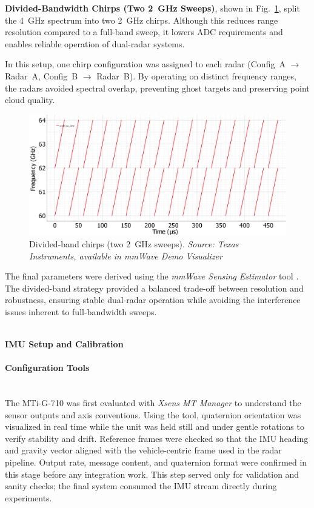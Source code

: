 \textbf{Divided-Bandwidth Chirps (Two 2~GHz Sweeps)}, shown in Fig.~\ref{fig:profile2GHz}, split the 4~GHz spectrum into two 2~GHz chirps.  
Although this reduces range resolution compared to a full-band sweep, it lowers ADC requirements and enables reliable operation of dual-radar systems.  

In this setup, one chirp configuration was assigned to each radar (Config~A $\rightarrow$ Radar~A, Config~B $\rightarrow$ Radar~B).  
By operating on distinct frequency ranges, the radars avoided spectral overlap, preventing ghost targets and preserving point cloud quality.  

\begin{figure}[!htbp]
    \centering
    \includegraphics[width=0.7\linewidth]{images/profile_two_2GHz.png}
    \caption{Divided-band chirps (two 2~GHz sweeps).  
    \textit{Source: Texas Instruments, available in mmWave Demo Visualizer \cite{mmwave_demo_doc}}}
    \label{fig:profile2GHz}
\end{figure}

The final parameters were derived using the \textit{mmWave Sensing Estimator} tool \cite{mmwave_demo_output}.  
The divided-band strategy provided a balanced trade-off between resolution and robustness, ensuring stable dual-radar operation while avoiding the interference issues inherent to full-bandwidth sweeps.

\hfill
\\
\vspace{0.5em}
\noindent\textbf{IMU Setup and Calibration}
\label{sec:imu_setup_calibration}

\setcounter{paragraph}{0} %

\paragraph{Configuration Tools}
\hfill
\\
The MTi-G-710 was first evaluated with \textit{Xsens MT Manager} to understand the sensor outputs and axis conventions.  
Using the tool, quaternion orientation was visualized in real time while the unit was held still and under gentle rotations to verify stability and drift.  
Reference frames were checked so that the IMU heading and gravity vector aligned with the vehicle-centric frame used in the radar pipeline.  
Output rate, message content, and quaternion format were confirmed in this stage before any integration work.  
This step served only for validation and sanity checks; the final system consumed the IMU stream directly during experiments.  
\vspace{0.5em}
